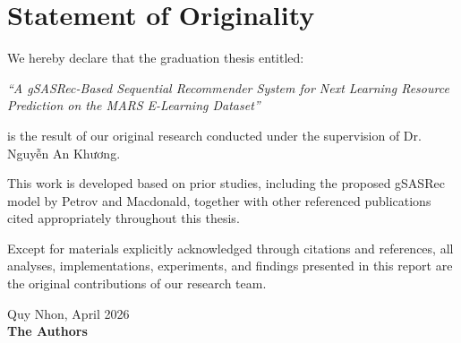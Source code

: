 
\section*{Statement of Originality}

We hereby declare that the graduation thesis entitled:

\begin{center}
\textit{
``A gSASRec-Based Sequential Recommender System for Next Learning Resource Prediction on the MARS E-Learning Dataset''
}
\end{center}

is the result of our original research conducted under the supervision of Dr. Nguyễn An Khương.

This work is developed based on prior studies, including the proposed gSASRec model by Petrov and Macdonald, together with other referenced publications cited appropriately throughout this thesis.

Except for materials explicitly acknowledged through citations and references, all analyses, implementations, experiments, and findings presented in this report are the original contributions of our research team.

\vspace{2cm}

\begin{flushright}
\begin{minipage}{0.35\textwidth}
\centering
Quy Nhon, April 2026 \\[1cm]

\textbf{The Authors}
\end{minipage}
\end{flushright}

\newpage
